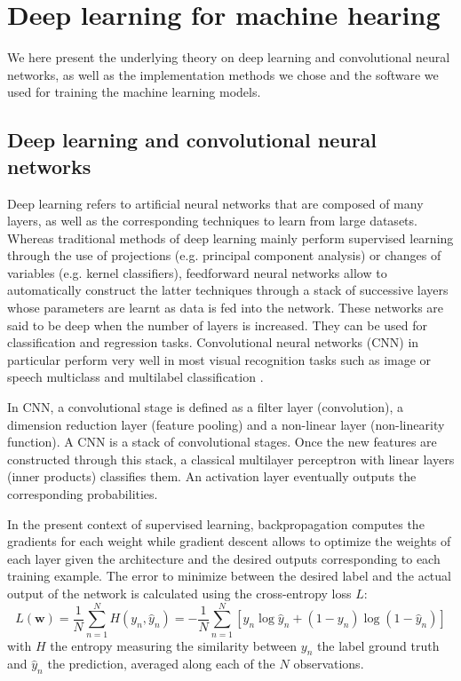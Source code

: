 \section{Deep learning for machine hearing}
\label{sec:introduction:deep_learning}

We here present the underlying theory on deep learning and convolutional neural networks, as well as the implementation methods we chose and the software we used for training the machine learning models.

\subsection{Deep learning and convolutional neural networks}
\label{sec:introduction:deep_learning:cnn}

Deep learning refers to artificial neural networks \parencite{haykin2004comprehensive} that are composed of many layers, as well as the corresponding techniques to learn from large datasets. Whereas traditional methods of deep learning mainly perform supervised learning through the use of projections (e.g. principal component analysis) or changes of variables (e.g. kernel classifiers), feedforward neural networks allow to automatically construct the latter techniques through a stack of successive layers whose parameters are learnt as data is fed into the network. These networks are said to be deep when the number of layers is increased. They can be used for classification and regression tasks. Convolutional neural networks (CNN) in particular perform very well in most visual recognition tasks such as image or speech multiclass and multilabel classification \parencite{lecun1995convolutional}.

In CNN, a convolutional stage is defined as a filter layer (convolution), a dimension reduction layer (feature pooling) and a non-linear layer (non-linearity function). A CNN is a stack of convolutional stages. Once the new features are constructed through this stack, a classical multilayer perceptron with linear layers (inner products) classifies them. An activation layer eventually outputs the corresponding probabilities.

In the present context of supervised learning, backpropagation computes the gradients for each weight while gradient descent allows to optimize the weights of each layer given the architecture and the desired outputs corresponding to each training example. The error to minimize between the desired label and the actual output of the network is calculated using the cross-entropy loss $L$:
\begin{equation}
L(\mathbf{w}) = \frac{1}{N} \sum_{n = 1}^{N} H(y_n, \hat{y}_n)
= - \frac{1}{N} \sum_{n = 1}^{N} \left[ y_n \log \hat{y}_n + (1 - y_n) \log (1 - \hat{y}_n) \right]
\end{equation}
with $H$ the entropy measuring the similarity between $y_n$ the label ground truth and $\hat{y}_n$ the prediction, averaged along each of the $N$ observations.

